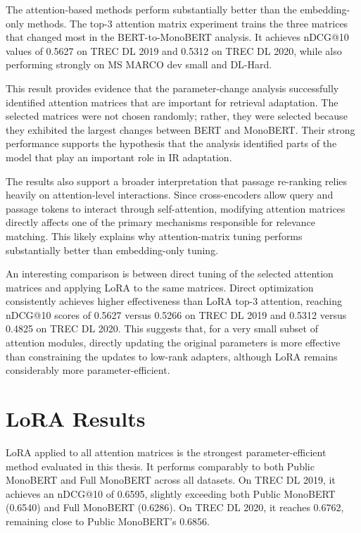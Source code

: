 The attention-based methods perform substantially better than the embedding-only methods. The top-3 attention matrix experiment trains the three matrices that changed most in the BERT-to-MonoBERT analysis. It achieves nDCG@10 values of 0.5627 on TREC DL 2019 and 0.5312 on TREC DL 2020, while also performing strongly on MS MARCO dev small and DL-Hard.

This result provides evidence that the parameter-change analysis successfully identified attention matrices that are important for retrieval adaptation. The selected matrices were not chosen randomly; rather, they were selected because they exhibited the largest changes between BERT and MonoBERT. Their strong performance supports the hypothesis that the analysis identified parts of the model that play an important role in IR adaptation.

The results also support a broader interpretation that passage re-ranking relies heavily on attention-level interactions. Since cross-encoders allow query and passage tokens to interact through self-attention, modifying attention matrices directly affects one of the primary mechanisms responsible for relevance matching. This likely explains why attention-matrix tuning performs substantially better than embedding-only tuning.

An interesting comparison is between direct tuning of the selected attention matrices and applying LoRA to the same matrices. Direct optimization consistently achieves higher effectiveness than LoRA top-3 attention, reaching nDCG@10 scores of 0.5627 versus 0.5266 on TREC DL 2019 and 0.5312 versus 0.4825 on TREC DL 2020. This suggests that, for a very small subset of attention modules, directly updating the original parameters is more effective than constraining the updates to low-rank adapters, although LoRA remains considerably more parameter-efficient.

\section{LoRA Results}
\label{sec:results_lora}

LoRA applied to all attention matrices is the strongest parameter-efficient method evaluated in this thesis. It performs comparably to both Public MonoBERT and Full MonoBERT across all datasets. On TREC DL 2019, it achieves an nDCG@10 of 0.6595, slightly exceeding both Public MonoBERT (0.6540) and Full MonoBERT (0.6286). On TREC DL 2020, it reaches 0.6762, remaining close to Public MonoBERT's 0.6856.

